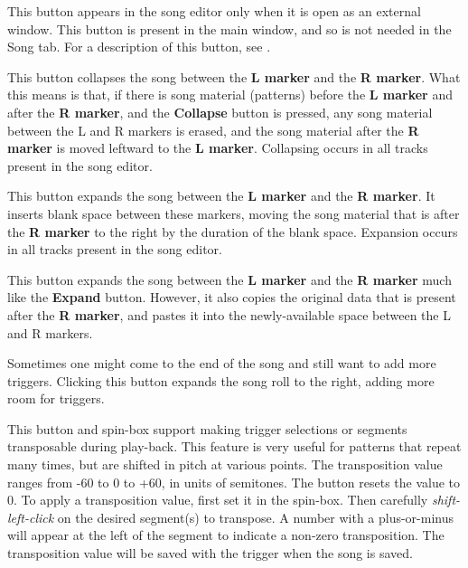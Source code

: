    This button appears in the song editor only when it is open as
   an external window.
   This button is present in the main window, and so is not needed
   in the Song tab.
   For a description of this button, see
   .

   This button collapses the song between the \textbf{L marker} and the
   \textbf{R marker}.
   What this means is that, if there is song material (patterns) before the
   \textbf{L marker} and after the \textbf{R marker},
   and the \textbf{Collapse} button is
   pressed, any song material between the L and R markers is erased, and
   the song material after the \textbf{R marker} is moved leftward to
   the \textbf{L marker}.
   Collapsing occurs in all tracks present in the song editor.

   This button expands the song between the
   \textbf{L marker} and the \textbf{R marker}.
   It inserts blank space between these markers, moving the song material
   that is after the \textbf{R marker}
   to the right by the duration of the blank space.
   Expansion occurs in all tracks present in the song editor.

   This button expands the song between the \textbf{L marker} and the
   \textbf{R marker} much like the \textbf{Expand} button.
   However, it also copies the original data that is present after the
   \textbf{R marker}, and pastes it into the newly-available space between
   the L and R markers.

   Sometimes one might come to the end of the song and still want to
   add more triggers.
   Clicking this button expands the song roll to the right, adding
   more room for triggers.

   This button and spin-box support making trigger selections or segments
   transposable during play-back.  This feature is very useful
   for patterns that repeat many times, but are shifted in pitch at various
   points.
   The transposition value ranges from -60 to 0 to +60, in units of semitones.
   The button resets the value to 0.
   To apply a transposition value, first set it in the spin-box.
   Then carefully \textsl{shift-left-click}
   on the desired segment(s) to transpose.
   A number with a plus-or-minus will appear at the left of the segment to
   indicate a non-zero transposition.
   The transposition value will be saved with the trigger when the song is
   saved.

